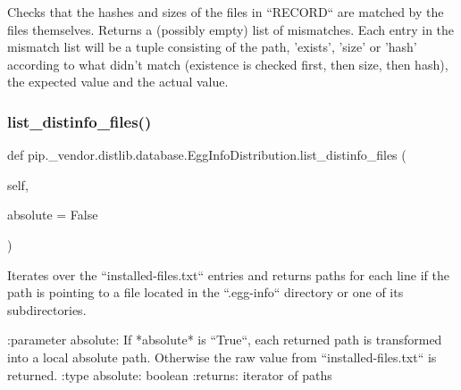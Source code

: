 \begin{DoxyVerb}Checks that the hashes and sizes of the files in ``RECORD`` are
matched by the files themselves. Returns a (possibly empty) list of
mismatches. Each entry in the mismatch list will be a tuple consisting
of the path, 'exists', 'size' or 'hash' according to what didn't match
(existence is checked first, then size, then hash), the expected
value and the actual value.
\end{DoxyVerb}
 \mbox{\label{classpip_1_1__vendor_1_1distlib_1_1database_1_1EggInfoDistribution_a81eb42fe04552504c3c44bae820de34b}} 
\subsubsection{\texorpdfstring{list\+\_\+distinfo\+\_\+files()}{list\_distinfo\_files()}}
{\footnotesize\ttfamily def pip.\+\_\+vendor.\+distlib.\+database.\+Egg\+Info\+Distribution.\+list\+\_\+distinfo\+\_\+files (\begin{DoxyParamCaption}\item[{}]{self,  }\item[{}]{absolute = {\ttfamily False} }\end{DoxyParamCaption})}

\begin{DoxyVerb}Iterates over the ``installed-files.txt`` entries and returns paths for
each line if the path is pointing to a file located in the
``.egg-info`` directory or one of its subdirectories.

:parameter absolute: If *absolute* is ``True``, each returned path is
          transformed into a local absolute path. Otherwise the
          raw value from ``installed-files.txt`` is returned.
:type absolute: boolean
:returns: iterator of paths
\end{DoxyVerb}
 \mbox{\label{classpip_1_1__vendor_1_1distlib_1_1database_1_1EggInfoDistribution_ad11f1a01b3d7117ca45670f4de85b97c}} 
